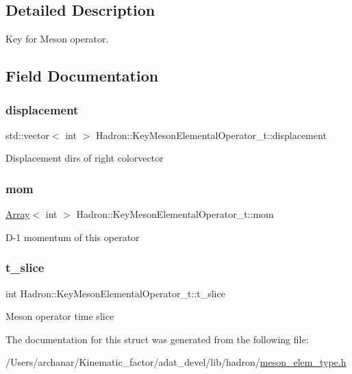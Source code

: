 \subsection{Detailed Description}
Key for Meson operator. 

\subsection{Field Documentation}
\mbox{\label{structHadron_1_1KeyMesonElementalOperator__t_ad634e00ae5b9c58fbe44e11e2df719c0}} 
\subsubsection{\texorpdfstring{displacement}{displacement}}
{\footnotesize\ttfamily std\+::vector$<$ int $>$ Hadron\+::\+Key\+Meson\+Elemental\+Operator\+\_\+t\+::displacement}

Displacement dirs of right colorvector \mbox{\label{structHadron_1_1KeyMesonElementalOperator__t_ab92553f02e0195a68148007008b0ef34}} 
\subsubsection{\texorpdfstring{mom}{mom}}
{\footnotesize\ttfamily \mbox{\hyperlink{classXMLArray_1_1Array}{Array}}$<$ int $>$ Hadron\+::\+Key\+Meson\+Elemental\+Operator\+\_\+t\+::mom}

D-\/1 momentum of this operator \mbox{\label{structHadron_1_1KeyMesonElementalOperator__t_ac241fd9a6af31e081d2582ce0389a3a4}} 
\subsubsection{\texorpdfstring{t\_slice}{t\_slice}}
{\footnotesize\ttfamily int Hadron\+::\+Key\+Meson\+Elemental\+Operator\+\_\+t\+::t\+\_\+slice}

Meson operator time slice 

The documentation for this struct was generated from the following file\+:\begin{DoxyCompactItemize}
\item 
/\+Users/archanar/\+Kinematic\+\_\+factor/adat\+\_\+devel/lib/hadron/\mbox{\hyperlink{lib_2hadron_2meson__elem__type_8h}{meson\+\_\+elem\+\_\+type.\+h}}\end{DoxyCompactItemize}
